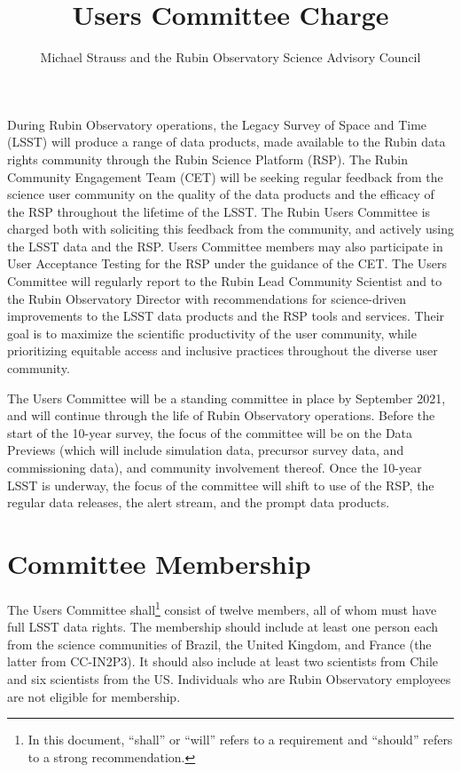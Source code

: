 \documentclass[OPS,toc]{lsstdoc}
\title{Users Committee Charge}
\author{%
Michael Strauss and the Rubin Observatory Science Advisory Council
}
\date{\vcsDate}
\begin{document}
\maketitle

During Rubin Observatory operations, the Legacy Survey of Space and Time (LSST) will produce a range of data products, made available to the Rubin data rights community through the Rubin Science Platform (RSP).
The Rubin Community Engagement Team (CET) will be seeking regular feedback from the science user community on the quality of the data products and the efficacy of the RSP throughout the lifetime of the LSST.
The Rubin Users Committee is charged both with soliciting this feedback from the community, and actively using the LSST data and the RSP.
Users Committee members may also participate in User Acceptance Testing for the RSP under the guidance of the CET.
The Users Committee will regularly report to the Rubin Lead Community Scientist and to the Rubin Observatory Director with recommendations for science-driven improvements to the LSST data products and the RSP tools and services.
Their goal is to maximize the scientific productivity of the user community, while prioritizing equitable access and inclusive practices throughout the diverse user community. 

The Users Committee will be a standing committee in place by September 2021, and will continue through the life of Rubin Observatory operations.
Before the start of the 10-year survey, the focus of the committee will be on the Data Previews (which will include simulation data, precursor survey data, and commissioning data), and community involvement thereof.
Once the 10-year LSST is underway, the focus of the committee will shift to use of the RSP, the regular data releases, the alert stream, and the prompt data products.  

\section{Committee Membership}

The Users Committee shall\footnote{In this document, “shall” or “will” refers to a requirement and “should” refers to a strong recommendation.} consist of twelve members, all of whom must have full LSST data rights.
The membership should include at least one person each from the science communities of Brazil, the United Kingdom, and France (the latter from CC-IN2P3).
It should also include at least two scientists from Chile and six scientists from the US.
Individuals who are Rubin Observatory employees are not eligible for membership. 
\end{document}
